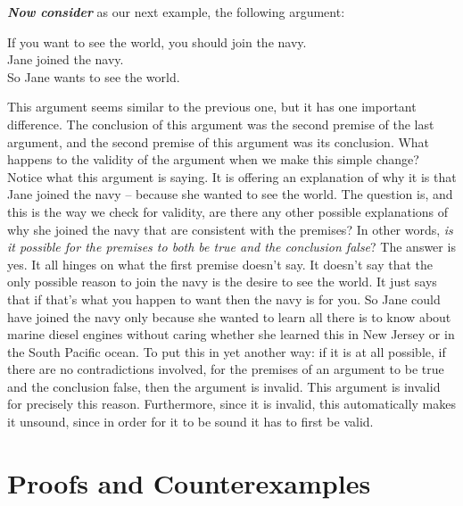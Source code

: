 \documentclass[
  12pt, openany]{book}
\theoremstyle{definition}
\theoremstyle{definition}
\theoremstyle{definition}
\theoremstyle{definition}
\theoremstyle{remark}
\begin{document}
\textbf{\emph{Now consider}} as our next example, the following argument:

\begin{center}

\begin{argument}
If you want to see the world, you should join the navy.\\
Jane joined the navy.\\

So Jane wants to see the world.

\end{argument}


\end{center}

This argument seems similar to the previous one, but it has one important difference. The conclusion of this argument was the second premise of the last argument, and the second premise of this argument was its conclusion. What happens to the validity of the argument when we make this simple change? Notice what this argument is saying. It is offering an explanation of why it is that Jane joined the navy -- because she wanted to see the world. The question is, and this is the way we check for validity, are there any other possible explanations of why she joined the navy that are consistent with the premises? In other words, \emph{is it possible for the premises to both be true and the conclusion false}? The answer is yes. It all hinges on what the first premise doesn't say. It doesn't say that the only possible reason to join the navy is the desire to see the world. It just says that if that's what you happen to want then the navy is for you. So Jane could have joined the navy only because she wanted to learn all there is to know about marine diesel engines without caring whether she learned this in New Jersey or in the South Pacific ocean. To put this in yet another way: if it is at all possible, if there are no contradictions involved, for the premises of an argument to be true and the conclusion false, then the argument is invalid. This argument is invalid for precisely this reason. Furthermore, since it is invalid, this automatically makes it unsound, since in order for it to be sound it has to first be valid.

\hypertarget{proofs-and-counterexamples}{%
\section{Proofs and Counterexamples}\label{proofs-and-counterexamples}}
\end{document}
